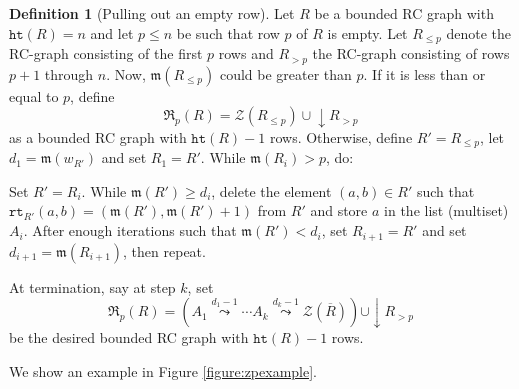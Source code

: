 \documentclass{amsart}
\theoremstyle{definition}
\newtheorem{definition}[lemma]{Definition}
\theoremstyle{remark}
\numberwithin{equation}{subsection}
\newcommand{\wof}[1]{w_{#1}}
\newcommand{\qr}{\mathfrak{R}}
\newcommand{\rtt}{\mathtt{rt}}
\newcommand{\zeromap}{\mathcal{Z}}
\newcommand{\hr}{\mathtt{ht}}
\newcommand{\maxd}{\mathfrak{m}}
\newcommand{\xleadsto}[2][]{\overset{#2}{\leadsto}}
\newcommand{\ins}[2]{{#2\xleadsto{#1}}}
\begin{document}
\begin{definition}[Pulling out an empty row]
Let $R$ be a bounded RC graph with $\hr(R)=n$ and let $p\leq n$ be such that row $p$ of $R$ is empty. Let $R_{\leq p}$ denote the RC-graph consisting of the first $p$ rows and $R_{>p}$ the RC-graph consisting of rows $p+1$ through $n$. Now, $\maxd(R_{\leq p})$ could be greater than $p$. If it is less than or equal to $p$, define 
$$\qr_p(R) = \zeromap(R_{\leq p})\cup {\downarrow R_{>p}}$$ 
as a bounded RC graph with $\hr(R)-1$ rows. Otherwise, define $R' = R_{\leq p}$, let $d_1 = \maxd(\wof{R'})$ and set $R_1 = R'$. While $\maxd(R_i) > p$, do:

Set $R'=R_i$. While $\maxd(R') \geq d_i$, delete the element $(a,b)\in R'$ such that $\rtt_{R'}(a,b)=(\maxd(R'),\maxd(R')+1)$ from $R'$ and store $a$ in the list (multiset) $A_i$. After enough iterations such that $\maxd(R')<d_i$, set $R_{i+1}= R'$ and set $d_{i+1}= \maxd(R_{i+1})$, then repeat. 

At termination, say at step $k$, set
$$\qr_p(R) = (\ins{d_1 - 1}{A_1}\cdots\ins{d_k - 1}{A_k}\zeromap(\overline{R}))\cup {\downarrow} R_{>p}$$
be the desired bounded RC graph with $\hr(R)-1$ rows.

We show an example in Figure \ref{figure:zpexample}.
\end{definition}
\end{document}
